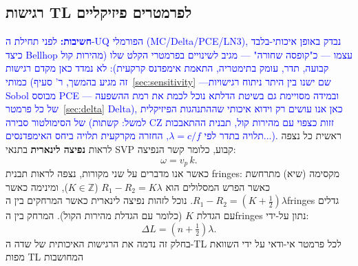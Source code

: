 \documentclass[12pt,a4paper]{article}
\DeclareRobustCommand{\aiedit}[1]{\textcolor{blue}{#1}}
\begin{document}
\subsection{רגישות TL לפרמטרים פיזיקליים}
\label{sec:qualitative_sensitivity}

\aiedit{\textbf{חשיבות:} לפני תחילת ה-UQ הפורמלי (MC/Delta/PCE/LN3), נבדק
באופן איכותי-בלבד כיצד \textenglish{Bellhop} עצמו — כ"קופסה שחורה" — מגיב לשינויים
בפרמטרי הקלט שלו (מהירות קול קבועה, תדר, עומק בתימטריה, התאמת אימפדנס קרקעית):
לא נמדד כאן מקדם רגישות כמותי (זה מגיע בהמשך, ר' סעיף~\ref{sec:sensitivity} —שם ישנו בין היתר ניתוח רגישויות
Sobol מבוסס PCE — ובמידה מסויימת גם בשיטת הדלתא נוכל לכמת את רמת ההשפעה של כל פרמטר~\ref{sec:delta}  Delta), כאן אנו עושים רק וידוא איכותי
שההתנהגות הפיזיקלית של הסימולטור סבירה (למשל: קשתות CZ זזות כצפוי עם מהירות קול,
תבנית ההתאבכות תלויה בתדר לפי $\lambda=c/f$, החזרה מקרקעית תלויה ביחס האימפדנסים...).}
ראשית כל נצפה לראות \textbf{נפיצה לינארית} בתנאי SVP קבוע, כלומר קשר הנפיצה:
\[
  \omega = v_p \, k.
\]
כאשר אנו מדברים על שני מקורות, נצפה לראות תבנית \textenglish{fringes}:
מקסימה (שיא) מתרחשת כאשר הפרש המסלולים הוא $R_1 - R_2 = K\lambda$ ($K\in\mathbb{Z}$),
ומינימה כאשר $R_1 - R_2 = (K+\tfrac{1}{2})\lambda$.
נוכל לזהות נפיצה לינארית כאשר המרחקים בין ה\textenglish{fringes} גדלים עם הגדלת $K$
(כלומר עם הגדלת מהירות הקול).
המרחק בין ה\textenglish{fringes} נתון על-ידי:
\begin{equation}
  \Delta L = \left(n + \tfrac{1}{2}\right)\lambda.
  \label{eq:fringe_spacing}
\end{equation}
בחלק זה נדמה את הרגישות האיכותית של שדה ה-TL לכל פרמטר אי-ודאי על ידי השוואת מפות TL המחושבות 
\end{document}
